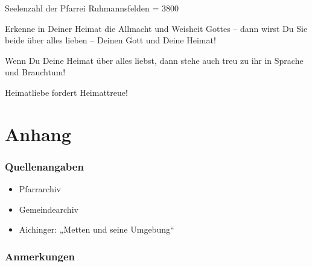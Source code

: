 \documentclass[12pt,a4paper]{book}
\begin{document}
Seelenzahl der Pfarrei Ruhmannsfelden = 3800

Erkenne in Deiner Heimat die Allmacht und Weisheit Gottes – dann wirst Du Sie
beide über alles lieben – Deinen Gott und Deine Heimat!

Wenn Du Deine Heimat über alles liebst, dann stehe auch treu zu ihr in Sprache
und Brauchtum!

Heimatliebe fordert Heimattreue!

\part{Anhang}

\section{Quellenangaben}

\begin{itemize}
  \item Pfarrarchiv
  \item Gemeindearchiv
  \item Aichinger: „Metten und seine Umgebung“
\end{itemize}

\section{Anmerkungen}
\end{document}
